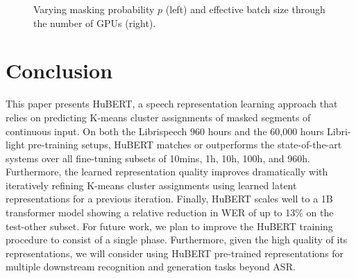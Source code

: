 \begin{figure}[ht]
  \centering
  \begin{subfigure}[b]{0.49\linewidth}
    \centering
{}  \end{subfigure}
  \begin{subfigure}[b]{0.49\linewidth}
    \centering
{}  \end{subfigure}
  \caption{Varying masking probability $p$ (left) and effective batch size through the number of GPUs (right).}
  \label{fig:prob_bs}
\end{figure}
\section{Conclusion}
This paper presents HuBERT, a speech representation learning approach that relies on predicting K-means cluster assignments of masked segments of continuous input. On both the Librispeech 960 hours and the 60,000 hours Libri-light pre-training setups, HuBERT matches or outperforms the state-of-the-art systems over all fine-tuning subsets of 10mins, 1h, 10h, 100h, and 960h. Furthermore, the learned representation quality improves dramatically with iteratively refining K-means cluster assignments using learned latent representations for a previous iteration. Finally, HuBERT scales well to a 1B transformer model showing a relative reduction in WER of up to 13\% on the test-other subset. For future work, we plan to improve the HuBERT training procedure to consist of a single phase. Furthermore, given the high quality of its representations, we will consider using HuBERT pre-trained representations for multiple downstream recognition and generation tasks beyond ASR.
\ifCLASSOPTIONcaptionsoff
  \newpage
\fi

